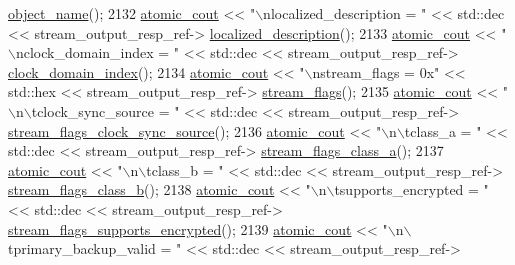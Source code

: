 \begin{DoxyCode}
      \hyperlink{classavdecc__lib_1_1descriptor__response__base_a133f7774946d80f82b8aaaa4cfbb7361}{object\_name}();
2132             \hyperlink{cmd__line_8h_a0bc38ccc65c79ba06c6fcd7b4bf554c3}{atomic\_cout} << \textcolor{stringliteral}{"\(\backslash\)nlocalized\_description = "} << std::dec << stream\_output\_resp\_ref->
      \hyperlink{classavdecc__lib_1_1stream__output__descriptor__response_a1fb9de45567df344090a1407aa6b775f}{localized\_description}();
2133             \hyperlink{cmd__line_8h_a0bc38ccc65c79ba06c6fcd7b4bf554c3}{atomic\_cout} << \textcolor{stringliteral}{"\(\backslash\)nclock\_domain\_index = "} << std::dec << stream\_output\_resp\_ref->
      \hyperlink{classavdecc__lib_1_1stream__output__descriptor__response_aab7f93d403d8b73f8f4a8fb7c61ecded}{clock\_domain\_index}();
2134             \hyperlink{cmd__line_8h_a0bc38ccc65c79ba06c6fcd7b4bf554c3}{atomic\_cout} << \textcolor{stringliteral}{"\(\backslash\)nstream\_flags = 0x"} << std::hex << stream\_output\_resp\_ref->
      \hyperlink{classavdecc__lib_1_1stream__output__descriptor__response_aca4a27df506a50c80228271902f0091e}{stream\_flags}();
2135             \hyperlink{cmd__line_8h_a0bc38ccc65c79ba06c6fcd7b4bf554c3}{atomic\_cout} << \textcolor{stringliteral}{"\(\backslash\)n\(\backslash\)tclock\_sync\_source = "} << std::dec << stream\_output\_resp\_ref->
      \hyperlink{classavdecc__lib_1_1stream__output__descriptor__response_a995e03199cdf8ff67b735e202ee731c9}{stream\_flags\_clock\_sync\_source}();
2136             \hyperlink{cmd__line_8h_a0bc38ccc65c79ba06c6fcd7b4bf554c3}{atomic\_cout} << \textcolor{stringliteral}{"\(\backslash\)n\(\backslash\)tclass\_a = "} << std::dec << stream\_output\_resp\_ref->
      \hyperlink{classavdecc__lib_1_1stream__output__descriptor__response_a12f7c478a280c8847869fc1effda0ac9}{stream\_flags\_class\_a}();
2137             \hyperlink{cmd__line_8h_a0bc38ccc65c79ba06c6fcd7b4bf554c3}{atomic\_cout} << \textcolor{stringliteral}{"\(\backslash\)n\(\backslash\)tclass\_b = "} << std::dec << stream\_output\_resp\_ref->
      \hyperlink{classavdecc__lib_1_1stream__output__descriptor__response_a0c1c9fe75737c0690cefe1597cf0d2f5}{stream\_flags\_class\_b}();
2138             \hyperlink{cmd__line_8h_a0bc38ccc65c79ba06c6fcd7b4bf554c3}{atomic\_cout} << \textcolor{stringliteral}{"\(\backslash\)n\(\backslash\)tsupports\_encrypted = "} << std::dec << stream\_output\_resp\_ref->
      \hyperlink{classavdecc__lib_1_1stream__output__descriptor__response_acf3491baaac1909aeeea303407a15b47}{stream\_flags\_supports\_encrypted}();
2139             \hyperlink{cmd__line_8h_a0bc38ccc65c79ba06c6fcd7b4bf554c3}{atomic\_cout} << \textcolor{stringliteral}{"\(\backslash\)n\(\backslash\)tprimary\_backup\_valid = "} << std::dec << stream\_output\_resp\_ref->

\end{DoxyCode}

